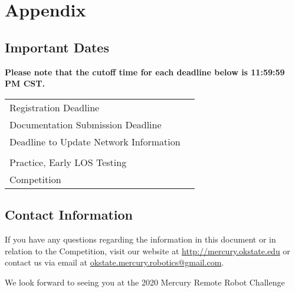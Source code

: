\section{Appendix}
\subsection{Important Dates}
\textbf{Please note that the cutoff time for each deadline below is 11:59:59 PM CST.} \\

\begin{tabular}{ll}
Registration Deadline					&	\registration		\\
Documentation Submission Deadline		&	\documentation	\\
Deadline to Update Network Information	&	\network			\\
									&	\\
Practice, Early LOS Testing				&	\los 			\\
Competition							&	\competition 		\\

\end{tabular}

\subsection{Contact Information}
If you have any questions regarding the information in this document or in relation to the Competition, visit our website at \url{http://mercury.okstate.edu} or contact us via email at \href{mailto:okstate.mercury.robotics@gmail.com}{ okstate.mercury.robotics@gmail.com}.

\vfill
\begin{center}
{\huge We look forward to seeing you at the 2020 Mercury Remote Robot Challenge}
\end{center}